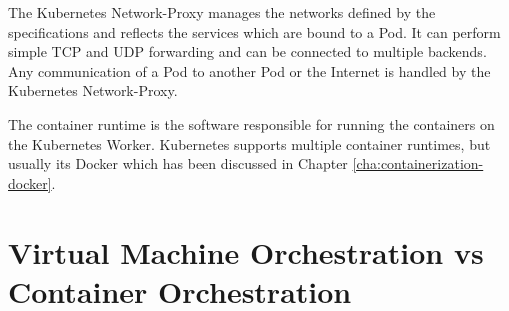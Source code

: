 The Kubernetes Network-Proxy manages the networks defined by the specifications and reflects the services which are bound to a Pod. It can perform simple TCP and UDP forwarding and can be connected to multiple backends. Any communication of a Pod to another Pod or the Internet is handled by the Kubernetes Network-Proxy. 

The container runtime is the software responsible for running the containers on the Kubernetes Worker. Kubernetes supports multiple container runtimes, but usually its Docker which has been discussed in Chapter \vref{cha:containerization-docker}.

\section{Virtual Machine Orchestration vs Container Orchestration}
\label{sec:caas-vm-vs-container-orchestration}

